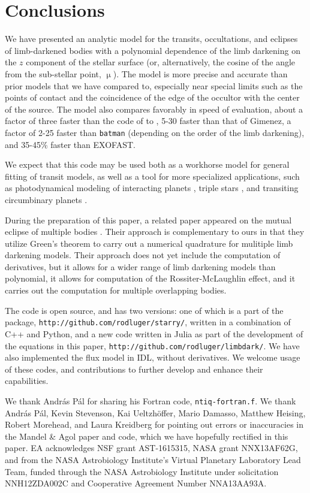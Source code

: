 \documentclass[modern]{aastex61}
\begin{document}
\section{Conclusions}

We have presented an analytic model for the transits, occultations, and
eclipses of limb-darkened bodies with a polynomial dependence of the limb darkening
on the $z$ component of the stellar surface (or, alternatively, the
cosine of the angle from the sub-stellar point, $\upmu$).  The model is more precise
and accurate than prior models that we have compared to, especially near
special limits such as the points of contact and the coincidence of the edge
of the occultor with the center of the source.  The model also compares favorably in
speed of evaluation, about a factor of three faster than the code of
to \citet{Pal2008}, 5-30 faster than that of Gimenez, a factor of 2-25 faster than \texttt{batman}
(depending on the order of the limb darkening), and 35-45\% faster than EXOFAST.

We expect that this code may be used both as a workhorse model for
general fitting of transit models, as well as a tool for more
specialized applications, such as photodynamical modeling of
interacting planets \citep{Carter2012}, triple stars \citep{Carter2011}, and
transiting circumbinary planets \citep{Doyle2011}.

During the preparation of this paper, a related paper appeared on
the mutual eclipse of multiple bodies \citep{Short2018}.  Their
approach is complementary to ours in that they utilize Green's theorem to
carry out a numerical quadrature for mulitiple limb darkening models.
Their approach does not yet include the computation of derivatives, but
it allows for a wider range of limb darkening models than polynomial, it
allows for computation of the Rossiter-McLaughlin effect, and it
carries out the computation for multiple overlapping bodies.

The code is open source, and has two versions:  one of which is a part
of the \starry package, \texttt{http://github.com/rodluger/starry/}, written
in a combination of C++ and Python, and a new code written in Julia as
part of the development of the equations in this paper,
\texttt{http://github.com/rodluger/limbdark/}.  We have also implemented
the flux model in IDL, without derivatives. We welcome usage of these
codes, and contributions to further develop and enhance their capabilities.

\acknowledgements

We thank Andr\'as P\'al for sharing his Fortran code, \texttt{ntiq-fortran.f}.
We thank Andr\'as P\'al, Kevin Stevenson, Kai Ueltzh\"offer, Mario Damasso,
Matthew Heising, Robert Morehead, and Laura Kreidberg for pointing out
errors or inaccuracies in the Mandel \& Agol paper and code, which we have
hopefully rectified in this paper.
EA acknowledges NSF grant AST-1615315, NASA grant NNX13AF62G, and from
the NASA Astrobiology Institute's Virtual Planetary Laboratory Lead Team,
funded through the NASA Astrobiology Institute under solicitation NNH12ZDA002C
and Cooperative Agreement Number NNA13AA93A.
\end{document}
